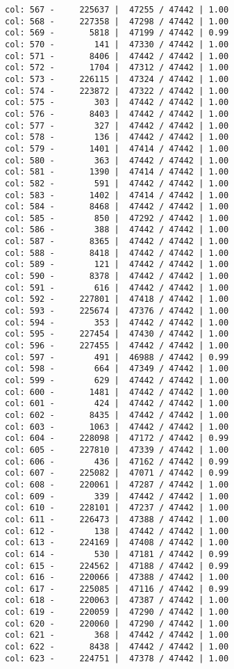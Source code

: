 \documentclass[11pt]{article}
\begin{document}
\begin{Verbatim}[commandchars=\\\{\}]
col: 567 -     225637 |  47255 / 47442 | 1.00
col: 568 -     227358 |  47298 / 47442 | 1.00
col: 569 -       5818 |  47199 / 47442 | 0.99
col: 570 -        141 |  47330 / 47442 | 1.00
col: 571 -       8406 |  47442 / 47442 | 1.00
col: 572 -       1704 |  47312 / 47442 | 1.00
col: 573 -     226115 |  47324 / 47442 | 1.00
col: 574 -     223872 |  47322 / 47442 | 1.00
col: 575 -        303 |  47442 / 47442 | 1.00
col: 576 -       8403 |  47442 / 47442 | 1.00
col: 577 -        327 |  47442 / 47442 | 1.00
col: 578 -        136 |  47442 / 47442 | 1.00
col: 579 -       1401 |  47414 / 47442 | 1.00
col: 580 -        363 |  47442 / 47442 | 1.00
col: 581 -       1390 |  47414 / 47442 | 1.00
col: 582 -        591 |  47442 / 47442 | 1.00
col: 583 -       1402 |  47414 / 47442 | 1.00
col: 584 -       8468 |  47442 / 47442 | 1.00
col: 585 -        850 |  47292 / 47442 | 1.00
col: 586 -        388 |  47442 / 47442 | 1.00
col: 587 -       8365 |  47442 / 47442 | 1.00
col: 588 -       8418 |  47442 / 47442 | 1.00
col: 589 -        121 |  47442 / 47442 | 1.00
col: 590 -       8378 |  47442 / 47442 | 1.00
col: 591 -        616 |  47442 / 47442 | 1.00
col: 592 -     227801 |  47418 / 47442 | 1.00
col: 593 -     225674 |  47376 / 47442 | 1.00
col: 594 -        353 |  47442 / 47442 | 1.00
col: 595 -     227454 |  47430 / 47442 | 1.00
col: 596 -     227455 |  47442 / 47442 | 1.00
col: 597 -        491 |  46988 / 47442 | 0.99
col: 598 -        664 |  47349 / 47442 | 1.00
col: 599 -        629 |  47442 / 47442 | 1.00
col: 600 -       1481 |  47442 / 47442 | 1.00
col: 601 -        424 |  47442 / 47442 | 1.00
col: 602 -       8435 |  47442 / 47442 | 1.00
col: 603 -       1063 |  47442 / 47442 | 1.00
col: 604 -     228098 |  47172 / 47442 | 0.99
col: 605 -     227810 |  47339 / 47442 | 1.00
col: 606 -        436 |  47162 / 47442 | 0.99
col: 607 -     225082 |  47071 / 47442 | 0.99
col: 608 -     220061 |  47287 / 47442 | 1.00
col: 609 -        339 |  47442 / 47442 | 1.00
col: 610 -     228101 |  47237 / 47442 | 1.00
col: 611 -     226473 |  47388 / 47442 | 1.00
col: 612 -        138 |  47442 / 47442 | 1.00
col: 613 -     224169 |  47408 / 47442 | 1.00
col: 614 -        530 |  47181 / 47442 | 0.99
col: 615 -     224562 |  47188 / 47442 | 0.99
col: 616 -     220066 |  47388 / 47442 | 1.00
col: 617 -     225085 |  47116 / 47442 | 0.99
col: 618 -     220063 |  47387 / 47442 | 1.00
col: 619 -     220059 |  47290 / 47442 | 1.00
col: 620 -     220060 |  47290 / 47442 | 1.00
col: 621 -        368 |  47442 / 47442 | 1.00
col: 622 -       8438 |  47442 / 47442 | 1.00
col: 623 -     224751 |  47378 / 47442 | 1.00

\end{Verbatim}
\end{document}
